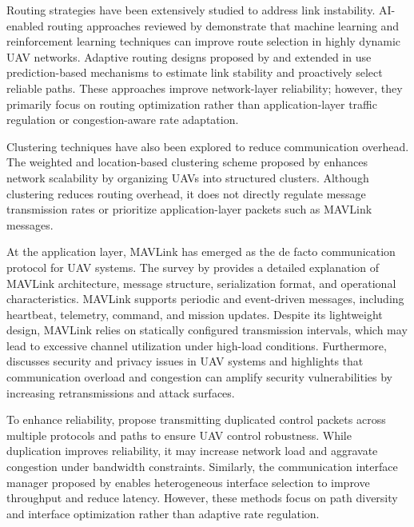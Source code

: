 \documentclass[pdflatex,sn-mathphys-num]{sn-jnl}%
\theoremstyle{thmstyleone}%
\theoremstyle{thmstyletwo}%
\theoremstyle{thmstylethree}%
\begin{document}
Routing strategies have been extensively studied to address link instability. AI-enabled routing approaches reviewed by \citet{rovira2022review} demonstrate that machine learning and reinforcement learning techniques can improve route selection in highly dynamic UAV networks. Adaptive routing designs proposed by \citet{zhang2022adaptive} and extended in \citet{zhang2023adaptive} use prediction-based mechanisms to estimate link stability and proactively select reliable paths. These approaches improve network-layer reliability; however, they primarily focus on routing optimization rather than application-layer traffic regulation or congestion-aware rate adaptation.

Clustering techniques have also been explored to reduce communication overhead. The weighted and location-based clustering scheme proposed by \citet{yang2022improved} enhances network scalability by organizing UAVs into structured clusters. Although clustering reduces routing overhead, it does not directly regulate message transmission rates or prioritize application-layer packets such as MAVLink messages.

At the application layer, MAVLink has emerged as the de facto communication protocol for UAV systems. The survey by \citet{koubaa2019micro} provides a detailed explanation of MAVLink architecture, message structure, serialization format, and operational characteristics. MAVLink supports periodic and event-driven messages, including heartbeat, telemetry, command, and mission updates. Despite its lightweight design, MAVLink relies on statically configured transmission intervals, which may lead to excessive channel utilization under high-load conditions. Furthermore, \citet{cordill2025comprehensive} discusses security and privacy issues in UAV systems and highlights that communication overload and congestion can amplify security vulnerabilities by increasing retransmissions and attack surfaces.

To enhance reliability, \citet{lee2021enabling} propose transmitting duplicated control packets across multiple protocols and paths to ensure UAV control robustness. While duplication improves reliability, it may increase network load and aggravate congestion under bandwidth constraints. Similarly, the communication interface manager proposed by \citet{ribeiro2021communication} enables heterogeneous interface selection to improve throughput and reduce latency. However, these methods focus on path diversity and interface optimization rather than adaptive rate regulation.
\end{document}
